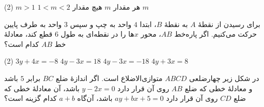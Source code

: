 \begin{moreactivities}
\noindent
\begin{minipage}[c]{0.65\textwidth}
    \raggedleft
    \begin{tasks}(2)
        \task \(m>1\)
        \task \(1<m<2\)
        \task هر مقدار \(m\)
        \task هیچ مقدار \(m\)
    \end{tasks}
\end{minipage}
\hfill
\begin{minipage}[c]{0.27\textwidth}
    \centering
\end{minipage}


\item برای رسیدن از نقطۀ \(A\) به نقطۀ \(B\)، ابتدا
\(4\) واحد به چپ و سپس \(3\) واحد به طرف پایین
حرکت می‌کنیم. اگر پاره‌خط \(AB\)، محور \(x\)ها
را در نقطه‌ای به طول \(6\) قطع کند، معادلۀ خط
\(AB\) کدام است؟

\begin{tasks}(2)
    \task \(3y+4x=-8\)
    \task \(4y-3x=18\)
    \task \(4y-3x=-18\)
    \task \(4y+3x=8\)
\end{tasks}


\item در شکل زیر چهارضلعی \(ABCD\) متوازی‌الاضلاع
است. اگر اندازۀ ضلع \(BC\) برابر \(5\) باشد و
معادلۀ خطی که ضلع \(AB\) روی آن قرار دارد
\(y-2x=0\) باشد، آن معادلۀ خطی که ضلع \(CD\)
روی آن قرار دارد \(ay+bx+5=0\) باشد،
آن‌گاه \(a+b\) کدام گزینه است؟


\end{moreactivities}
